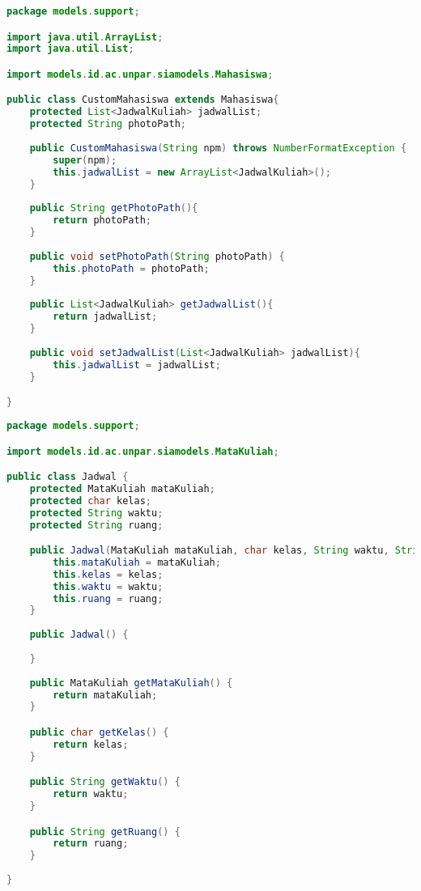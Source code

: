 \singlespacing 
\begin{lstlisting}[language=Java,basicstyle=\tiny,caption=CustomMahasiswa.java]
package models.support;

import java.util.ArrayList;
import java.util.List;

import models.id.ac.unpar.siamodels.Mahasiswa;

public class CustomMahasiswa extends Mahasiswa{
	protected List<JadwalKuliah> jadwalList;
	protected String photoPath;
	
	public CustomMahasiswa(String npm) throws NumberFormatException {
		super(npm);
		this.jadwalList = new ArrayList<JadwalKuliah>();
	}
	
	public String getPhotoPath(){
    	return photoPath;
    }
	
	public void setPhotoPath(String photoPath) {
		this.photoPath = photoPath;
	}
	
	public List<JadwalKuliah> getJadwalList(){
    	return jadwalList;
    }
	
	public void setJadwalList(List<JadwalKuliah> jadwalList){
    	this.jadwalList = jadwalList;
    }

}
\end{lstlisting}

\singlespacing 
\begin{lstlisting}[language=Java,basicstyle=\tiny,caption=Jadwal.java]
package models.support;

import models.id.ac.unpar.siamodels.MataKuliah;

public class Jadwal {
    protected MataKuliah mataKuliah;
    protected char kelas;
    protected String waktu;
    protected String ruang;

    public Jadwal(MataKuliah mataKuliah, char kelas, String waktu, String ruang) {
        this.mataKuliah = mataKuliah;
        this.kelas = kelas;
        this.waktu = waktu;
        this.ruang = ruang;
    }
    
    public Jadwal() {
        
    }
    
    public MataKuliah getMataKuliah() {
        return mataKuliah;
    }

    public char getKelas() {
        return kelas;
    }

    public String getWaktu() {
        return waktu;
    }

    public String getRuang() {
        return ruang;
    }
    
}
\end{lstlisting}


